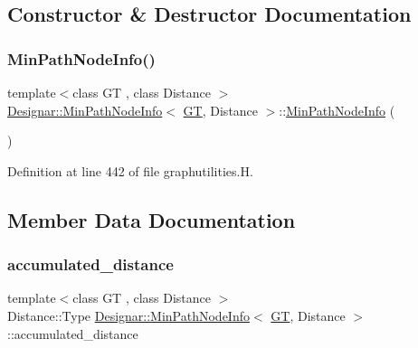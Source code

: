 \subsection{Constructor \& Destructor Documentation}
\mbox{\label{class_designar_1_1_min_path_node_info_a50c93fccfecfd75d3aa7637be108ef4d}} 
\subsubsection{\texorpdfstring{Min\+Path\+Node\+Info()}{MinPathNodeInfo()}}
{\footnotesize\ttfamily template$<$class GT , class Distance $>$ \\
\hyperlink{class_designar_1_1_min_path_node_info}{Designar\+::\+Min\+Path\+Node\+Info}$<$ \hyperlink{demo-buildgraph_8_c_a3001c40d2c31ca87ed96cd7d1334a55e}{GT}, Distance $>$\+::\hyperlink{class_designar_1_1_min_path_node_info}{Min\+Path\+Node\+Info} (\begin{DoxyParamCaption}{ }\end{DoxyParamCaption})\hspace{0.3cm}{\ttfamily [inline]}}



Definition at line 442 of file graphutilities.\+H.



\subsection{Member Data Documentation}
\mbox{\label{class_designar_1_1_min_path_node_info_acd8b2664b0726bf26b0f66213e4f1e4b}} 
\subsubsection{\texorpdfstring{accumulated\+\_\+distance}{accumulated\_distance}}
{\footnotesize\ttfamily template$<$class GT , class Distance $>$ \\
Distance\+::\+Type \hyperlink{class_designar_1_1_min_path_node_info}{Designar\+::\+Min\+Path\+Node\+Info}$<$ \hyperlink{demo-buildgraph_8_c_a3001c40d2c31ca87ed96cd7d1334a55e}{GT}, Distance $>$\+::accumulated\+\_\+distance}



